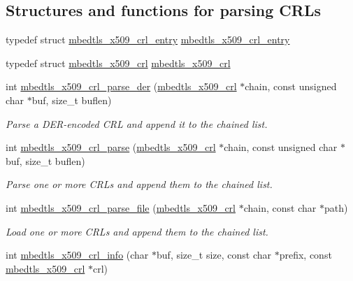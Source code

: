 \subsection*{Structures and functions for parsing C\+R\+Ls}
\begin{DoxyCompactItemize}
\item 
typedef struct \mbox{\hyperlink{structmbedtls__x509__crl__entry}{mbedtls\+\_\+x509\+\_\+crl\+\_\+entry}} \mbox{\hyperlink{group__x509__module_ga1e0c6230061fd501f9d00bd1b09ade33}{mbedtls\+\_\+x509\+\_\+crl\+\_\+entry}}
\item 
typedef struct \mbox{\hyperlink{structmbedtls__x509__crl}{mbedtls\+\_\+x509\+\_\+crl}} \mbox{\hyperlink{group__x509__module_ga7957605a0ced963e12880ec9e19874fc}{mbedtls\+\_\+x509\+\_\+crl}}
\item 
int \mbox{\hyperlink{group__x509__module_ga29ab5f1216a727b334ee26cce9f5d4b5}{mbedtls\+\_\+x509\+\_\+crl\+\_\+parse\+\_\+der}} (\mbox{\hyperlink{structmbedtls__x509__crl}{mbedtls\+\_\+x509\+\_\+crl}} $\ast$chain, const unsigned char $\ast$buf, size\+\_\+t buflen)
\begin{DoxyCompactList}\small\item\em Parse a D\+E\+R-\/encoded C\+RL and append it to the chained list. \end{DoxyCompactList}\item 
int \mbox{\hyperlink{group__x509__module_gadfce4fc5f5af62e371695e74c5b67d70}{mbedtls\+\_\+x509\+\_\+crl\+\_\+parse}} (\mbox{\hyperlink{structmbedtls__x509__crl}{mbedtls\+\_\+x509\+\_\+crl}} $\ast$chain, const unsigned char $\ast$buf, size\+\_\+t buflen)
\begin{DoxyCompactList}\small\item\em Parse one or more C\+R\+Ls and append them to the chained list. \end{DoxyCompactList}\item 
int \mbox{\hyperlink{group__x509__module_ga8e096827f1240b8f8bc15d6a83593f22}{mbedtls\+\_\+x509\+\_\+crl\+\_\+parse\+\_\+file}} (\mbox{\hyperlink{structmbedtls__x509__crl}{mbedtls\+\_\+x509\+\_\+crl}} $\ast$chain, const char $\ast$path)
\begin{DoxyCompactList}\small\item\em Load one or more C\+R\+Ls and append them to the chained list. \end{DoxyCompactList}\item 
int \mbox{\hyperlink{group__x509__module_ga35898e101f5039c6db6b930da9892366}{mbedtls\+\_\+x509\+\_\+crl\+\_\+info}} (char $\ast$buf, size\+\_\+t size, const char $\ast$prefix, const \mbox{\hyperlink{structmbedtls__x509__crl}{mbedtls\+\_\+x509\+\_\+crl}} $\ast$crl)

\end{DoxyCompactItemize}
